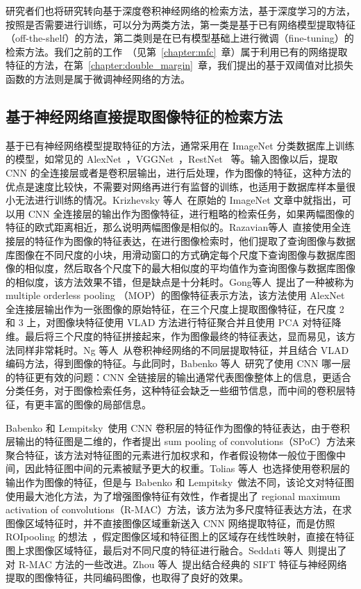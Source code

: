 研究者们也将研究转向基于深度卷积神经网络的检索方法，基于深度学习的方法，按照是否需要进行训练，可以分为两类方法，第一类是基于已有网络模型提取特征（off-the-shelf）的方法，第二类则是在已有模型基础上进行微调（fine-tuning）的检索方法。我们之前的工作~\cite{Hao2017MFCAM}（见第~\ref{chapter:mfc}~章）属于利用已有的网络提取特征的方法，在第~\ref{chapter:double_margin}~章，我们提出的基于双阈值对比损失函数的方法则是属于微调神经网络的方法。

\subsection{基于神经网络直接提取图像特征的检索方法}

基于已有神经网络模型提取特征的方法，通常采用在 ImageNet 分类数据库上训练的模型，如常见的 AlexNet~\cite{Krizhevsky2012ImageNetCW}，VGGNet~\cite{Simonyan2014VeryDC}，RestNet~\cite{He2016DeepRL} 等。输入图像以后，提取 CNN 的全连接层或者是卷积层输出，进行后处理，作为图像的特征，这种方法的优点是速度比较快，不需要对网络再进行有监督的训练，也适用于数据库样本量很小无法进行训练的情况。Krizhevsky 等人~\cite{Krizhevsky2012ImageNetCW}在原始的 ImageNet 文章中就指出，可以用 CNN 全连接层的输出作为图像特征，进行粗略的检索任务，如果两幅图像的特征的欧式距离相近，那么说明两幅图像是相似的。Razavian等人~\cite{Razavian2014CNNFO}直接使用全连接层的特征作为图像的特征表达，在进行图像检索时，他们提取了查询图像与数据库图像在不同尺度的小块，用滑动窗口的方式确定每个尺度下查询图像与数据库图像的相似度，然后取各个尺度下的最大相似度的平均值作为查询图像与数据库图像的相似度，该方法效果不错，但是缺点是十分耗时。Gong等人~\cite{Gong2014MultiscaleOP}提出了一种被称为 multiple orderless pooling （MOP）的图像特征表示方法，该方法使用 AlexNet 全连接层输出作为一张图像的原始特征，在三个尺度上提取图像特征，在尺度 2 和 3 上，对图像块特征使用 VLAD 方法进行特征聚合并且使用 PCA 对特征降维。最后将三个尺度的特征拼接起来，作为图像最终的特征表达，显而易见，该方法同样非常耗时。Ng 等人~\cite{Ng2015ExploitingLF}从卷积神经网络的不同层提取特征，并且结合 VLAD 编码方法，得到图像的特征。与此同时，Babenko 等人~\cite{Babenko2014NeuralCF}研究了使用 CNN 哪一层的特征更有效的问题：CNN 全链接层的输出通常代表图像整体上的信息，更适合分类任务，对于图像检索任务，这种特征会缺乏一些细节信息，而中间的卷积层特征，有更丰富的图像的局部信息。

Babenko 和 Lempitsky~\cite{Babenko2015AggregatingLD}使用 CNN 卷积层的特征作为图像的特征表达，由于卷积层输出的特征图是二维的，作者提出 sum pooling of convolutions（SPoC）方法来聚合特征，该方法对特征图的元素进行加权求和，作者假设物体一般位于图像中间，因此特征图中间的元素被赋予更大的权重。Tolias 等人~\cite{Tolias2015ParticularOR}也选择使用卷积层的输出作为图像的特征，但是与 Babenko 和 Lempitsky~\cite{Babenko2015AggregatingLD}做法不同，该论文对特征图使用最大池化方法，为了增强图像特征有效性，作者提出了 regional maximum activation of convolutions（R-MAC）方法，该方法为多尺度特征表达方法，在求图像区域特征时，并不直接图像区域重新送入 CNN 网络提取特征，而是仿照 ROIpooling 的想法~\cite{Ren2017FasterRT}，假定图像区域和特征图上的区域存在线性映射，直接在特征图上求图像区域特征，最后对不同尺度的特征进行融合。Seddati 等人~\cite{Seddati2017TowardsGP}则提出了对 R-MAC 方法的一些改进。Zhou 等人~\cite{Zhou2017CollaborativeIE}提出结合经典的 SIFT 特征与神经网络提取的图像特征，共同编码图像，也取得了良好的效果。

